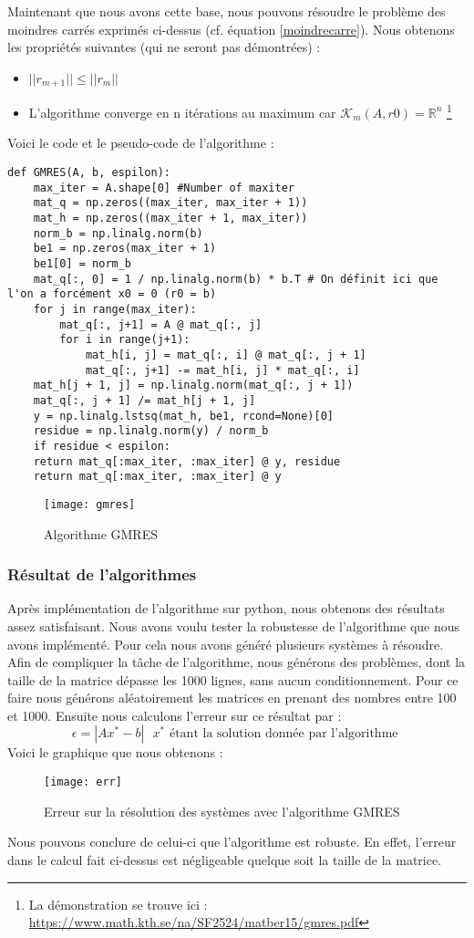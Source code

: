 Maintenant que nous avons cette base, nous pouvons résoudre le problème des moindres carrés exprimés ci-dessus (cf. équation \ref{moindrecarre}). Nous obtenons les propriétés suivantes (qui ne seront pas démontrées)  : 
\begin{itemize}
	\item $||r_{m+1}|| \leq ||r_m||$
	\item L'algorithme converge en n itérations au maximum car $\mathcal{K}_m(A, r0) = \mathbb{R}^n$ \footnote{La démonstration se trouve ici : \url{https://www.math.kth.se/na/SF2524/matber15/gmres.pdf}}
\end{itemize}
Voici le code et le pseudo-code de l'algorithme : 
\begin{verbatim}
def GMRES(A, b, espilon):
	max_iter = A.shape[0] #Number of maxiter
	mat_q = np.zeros((max_iter, max_iter + 1))
	mat_h = np.zeros((max_iter + 1, max_iter))
	norm_b = np.linalg.norm(b)
	be1 = np.zeros(max_iter + 1)
	be1[0] = norm_b
	mat_q[:, 0] = 1 / np.linalg.norm(b) * b.T # On définit ici que l'on a forcément x0 = 0 (r0 = b)
	for j in range(max_iter):
		mat_q[:, j+1] = A @ mat_q[:, j]
		for i in range(j+1):
			mat_h[i, j] = mat_q[:, i] @ mat_q[:, j + 1]
			mat_q[:, j+1] -= mat_h[i, j] * mat_q[:, i]
	mat_h[j + 1, j] = np.linalg.norm(mat_q[:, j + 1])
	mat_q[:, j + 1] /= mat_h[j + 1, j]
	y = np.linalg.lstsq(mat_h, be1, rcond=None)[0]
	residue = np.linalg.norm(y) / norm_b
	if residue < espilon:
	return mat_q[:max_iter, :max_iter] @ y, residue
	return mat_q[:max_iter, :max_iter] @ y
\end{verbatim}
\begin{figure}
	\centering
	\texttt{[image: gmres]}
	\caption{Algorithme GMRES}
	\label{fig:gmres}
\end{figure}
\subsubsection{Résultat de l'algorithmes}

Après implémentation de l'algorithme sur python, nous obtenons des résultats assez satisfaisant. Nous avons voulu tester la robustesse de l'algorithme que nous avons implémenté. Pour cela nous avons généré plusieurs systèmes à résoudre. Afin de compliquer la tâche de l'algorithme, nous générons des problèmes, dont la taille de la matrice dépasse les 1000 lignes, sans aucun conditionnement. Pour ce faire nous générons aléatoirement les matrices en prenant des nombres entre 100 et 1000. Ensuite nous calculons l'erreur sur ce résultat par : 
\begin{equation}
\epsilon = |Ax^* - b| \text{ $x^*$ étant la solution donnée par l'algorithme }
\end{equation} 
Voici le graphique que nous obtenons : 
\begin{figure}[H]
	\centering
	\texttt{[image: err]}
	\caption{Erreur sur la résolution des systèmes avec l'algorithme GMRES}
	\label{fig:err}
\end{figure}

Nous pouvons conclure de celui-ci que l'algorithme est robuste. En effet, l'erreur dans le calcul fait ci-dessus est négligeable quelque soit la taille de la matrice.